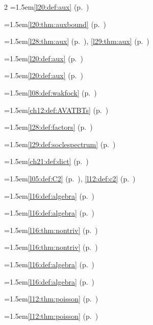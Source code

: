 \begin{multicols}{2}
\hangindent=1.5em\quad \ref{l20:def:aux} (p.~\pageref{l20:def:aux})\par
\hangindent=1.5em\quad \ref{l20:thm:auxbound} (p.~\pageref{l20:thm:auxbound})\par
\hangindent=1.5em\quad \ref{l28:thm:aux} (p.~\pageref{l28:thm:aux}), \ref{l29:thm:aux} (p.~\pageref{l29:thm:aux})\par
\hangindent=1.5em\quad \ref{l20:def:aux} (p.~\pageref{l20:def:aux})\par
\hangindent=1.5em\quad \ref{l20:def:aux} (p.~\pageref{l20:def:aux})\par
\hangindent=1.5em\quad \ref{l08:def:wakfock} (p.~\pageref{l08:def:wakfock})\par
\hangindent=1.5em\quad \ref{ch12:def:AVATBTs} (p.~\pageref{ch12:def:AVATBTs})\par
\hangindent=1.5em\quad \ref{l28:def:factors} (p.~\pageref{l28:def:factors})\par
\hangindent=1.5em\quad \ref{l29:def:soclespectrum} (p.~\pageref{l29:def:soclespectrum})\par
\hangindent=1.5em\quad \ref{ch21:def:dict} (p.~\pageref{ch21:def:dict})\par
\hangindent=1.5em\quad \ref{l05:def:C2} (p.~\pageref{l05:def:C2}), \ref{l12:def:c2} (p.~\pageref{l12:def:c2})\par
\hangindent=1.5em\quad \ref{l16:def:algebra} (p.~\pageref{l16:def:algebra})\par
\hangindent=1.5em\quad \ref{l16:def:algebra} (p.~\pageref{l16:def:algebra})\par
\hangindent=1.5em\quad \ref{l16:thm:nontriv} (p.~\pageref{l16:thm:nontriv})\par
\hangindent=1.5em\quad \ref{l16:thm:nontriv} (p.~\pageref{l16:thm:nontriv})\par
\hangindent=1.5em\quad \ref{l16:def:algebra} (p.~\pageref{l16:def:algebra})\par
\hangindent=1.5em\quad \ref{l16:def:algebra} (p.~\pageref{l16:def:algebra})\par
\hangindent=1.5em\quad \ref{l12:thm:poisson} (p.~\pageref{l12:thm:poisson})\par
\hangindent=1.5em\quad \ref{l12:thm:poisson} (p.~\pageref{l12:thm:poisson})\par

\end{multicols}
